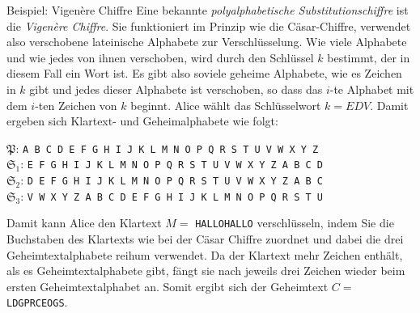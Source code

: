 \documentclass[german]{spicker}
\begin{document}
\begin{bonus}{Beispiel: Vigenère Chiffre}
    Eine bekannte \emph{polyalphabetische Substitutionschiffre} ist die \emph{Vigenère Chiffre}.
    Sie funktioniert im Prinzip wie die Cäsar-Chiffre, verwendet also verschobene
    lateinische Alphabete zur Verschlüsselung. Wie viele Alphabete und wie
    jedes von ihnen verschoben, wird durch den Schlüssel $k$ bestimmt, der in diesem
    Fall ein Wort ist. Es gibt also soviele geheime Alphabete, wie es Zeichen
    in $k$ gibt und jedes dieser Alphabete ist verschoben, so dass das $i$-te Alphabet
    mit dem $i$-ten Zeichen von $k$ beginnt.
    Alice wählt das Schlüsselwort $k = EDV$. Damit ergeben sich Klartext- und
    Geheimalphabete wie folgt:

    \begin{center}
        $\mathfrak{P}$: \texttt{A B C D E F G H I J K L M N O P Q R S T U V W X Y Z}\\
        $\mathfrak{S}_1$: \texttt{E F G H I J K L M N O P Q R S T U V W X Y Z A B C D}\\
        $\mathfrak{S}_2$: \texttt{D E F G H I J K L M N O P Q R S T U V W X Y Z A B C}\\
        $\mathfrak{S}_3$: \texttt{V W X Y Z A B C D E F G H I J K L M N O P Q R S T U}\\
    \end{center}

    Damit kann Alice den Klartext $M =$ \texttt{HALLOHALLO} verschlüsseln, indem Sie
    die Buchstaben des Klartexts wie bei der Cäsar Chiffre zuordnet und dabei die
    drei Geheimtextalphabete reihum verwendet. Da der Klartext mehr Zeichen
    enthält, als es Geheimtextalphabete gibt, fängt sie nach jeweils drei Zeichen
    wieder beim ersten Geheimtextalphabet an. Somit ergibt sich der Geheimtext
    $C =$ \texttt{LDGPRCEOGS}.
\end{bonus}
\end{document}
